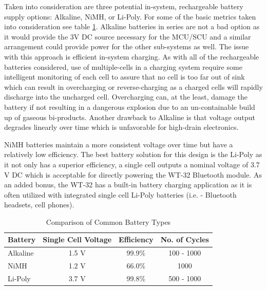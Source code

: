 Taken into consideration are three potential in-system, rechargeable battery supply options: Alkaline, NiMH, or Li-Poly. For some of the basic metrics taken into consideration see table \ref{tab:battery comparison}. Alkaline batteries in series are not a bad option as it would provide the 3V DC source necessary for the MCU/SCU and a similar arrangement could provide power for the other sub-systems as well. The issue with this approach is efficient in-system charging. As with all of the rechargeable batteries considered, use of multiple-cells in a charging system require some intelligent monitoring of each cell to assure that no cell is too far out of sink which can result in overcharging or reverse-charging as a charged cells will rapidly discharge into the uncharged cell. Overcharging can, at the least, damage the battery if not resulting in a dangerous explosion due to an un-containable build up of gaseous bi-products. Another drawback to Alkaline is that voltage output degrades linearly over time which is unfavorable for high-drain electronics. 

NiMH batteries maintain a more consistent voltage over time but have a relatively low efficiency. The best battery solution for this design is the Li-Poly as it not only has a superior efficiency, a single cell outputs a nominal voltage of 3.7 V DC which is acceptable for directly powering the WT-32 Bluetooth \textregistered module. As an added bonus, the WT-32 has a built-in battery charging application as it is often utilized with integrated single cell Li-Poly batteries (i.e. - Bluetooth \textregistered headsets, cell phones). 
  
\begin{table}[bhp]
\caption[Common Battery Types]{Comparison of Common Battery Types\cite{web:bat-tech}}
\small
\begin{center}
\begin{tabular}{l| c c c}
\setlength{\tabcolsep}{1pt}
	Battery     & Single Cell Voltage   & Efficiency & No. of Cycles\\\hline
	Alkaline & 1.5 V                    & 99.9\%        & 100 - 1000\\             
	NiMH     & 1.2 V                    & 66.0\%        & 1000      \\            
  Li-Poly  & 3.7 V		                & 99.8\%        & 500 - 1000 
\end{tabular}
\end{center}
\label{tab:battery comparison}
\end{table}

